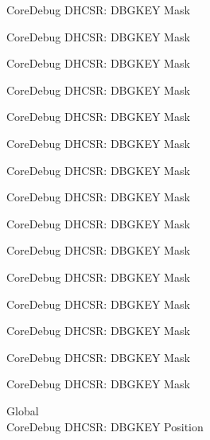 \begin{DoxyRefList}
\label{deprecated__deprecated000106}%
%
Core\+Debug DHCSR\+: DBGKEY Mask 

\label{deprecated__deprecated000160}%
%
Core\+Debug DHCSR\+: DBGKEY Mask 

\label{deprecated__deprecated000245}%
%
Core\+Debug DHCSR\+: DBGKEY Mask 

\label{deprecated__deprecated000302}%
%
Core\+Debug DHCSR\+: DBGKEY Mask 

\label{deprecated__deprecated000378}%
%
Core\+Debug DHCSR\+: DBGKEY Mask 

\label{deprecated__deprecated000457}%
%
Core\+Debug DHCSR\+: DBGKEY Mask 

\label{deprecated__deprecated000559}%
%
Core\+Debug DHCSR\+: DBGKEY Mask 

\label{deprecated__deprecated000684}%
%
Core\+Debug DHCSR\+: DBGKEY Mask 

\label{deprecated__deprecated000784}%
%
Core\+Debug DHCSR\+: DBGKEY Mask 

\label{deprecated__deprecated000838}%
%
Core\+Debug DHCSR\+: DBGKEY Mask 

\label{deprecated__deprecated000923}%
%
Core\+Debug DHCSR\+: DBGKEY Mask 

\label{deprecated__deprecated000980}%
%
Core\+Debug DHCSR\+: DBGKEY Mask 

\label{deprecated__deprecated001056}%
%
Core\+Debug DHCSR\+: DBGKEY Mask 

\label{deprecated__deprecated001135}%
%
Core\+Debug DHCSR\+: DBGKEY Mask 

\label{deprecated__deprecated001237}%
%
Core\+Debug DHCSR\+: DBGKEY Mask  
\item[Global \doxylink{group___c_m_s_i_s___core_debug_gac91280edd0ce932665cf75a23d11d842}{Core\+Debug\+\_\+\+DHCSR\+\_\+\+DBGKEY\+\_\+\+Pos} ]\hfill \\
\label{deprecated__deprecated000005}%
%
Core\+Debug DHCSR\+: DBGKEY Position 


\end{DoxyRefList}
